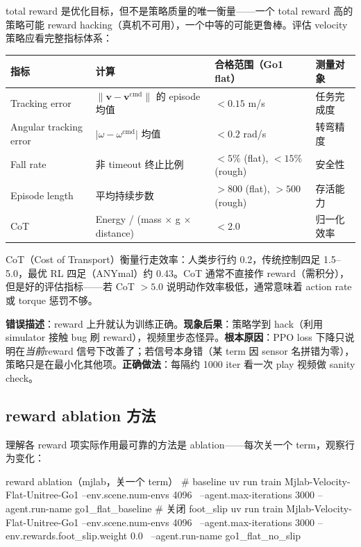 total reward 是优化目标，但不是策略质量的唯一衡量——一个 total reward 高的策略可能 reward hacking（真机不可用），一个中等的可能更鲁棒。评估 velocity 策略应看完整指标体系：

\begin{center}
\small
\begin{tabular}{@{}llll@{}}
\toprule
指标 & 计算 & 合格范围（Go1 flat） & 测量对象 \\
\midrule
Tracking error & $\lVert \mathbf{v}-\mathbf{v}^{\text{cmd}}\rVert$ 的 episode 均值 & $<0.15$ m/s & 任务完成度 \\
Angular tracking error & $\lvert \omega-\omega^{\text{cmd}}\rvert$ 均值 & $<0.2$ rad/s & 转弯精度 \\
Fall rate & 非 timeout 终止比例 & $<5\%$ (flat), $<15\%$ (rough) & 安全性 \\
Episode length & 平均持续步数 & $>800$ (flat), $>500$ (rough) & 存活能力 \\
CoT & Energy / (mass $\times$ g $\times$ distance) & $<2.0$ & 归一化效率 \\
\bottomrule
\end{tabular}
\end{center}

CoT（Cost of Transport）衡量行走效率：人类步行约 0.2，传统控制四足 1.5--5.0，最优 RL 四足（ANYmal）约 0.43。CoT 通常不直接作 reward（需积分），但是好的评估指标——若 CoT $>5.0$ 说明动作效率极低，通常意味着 action rate 或 torque 惩罚不够。

\begin{pitfall}
\textbf{错误描述}：reward 上升就认为训练正确。\textbf{现象后果}：策略学到 hack（利用 simulator 接触 bug 刷 reward），视频里步态怪异。\textbf{根本原因}：PPO loss 下降只说明在\emph{当前}reward 信号下改善了；若信号本身错（某 term 因 sensor 名拼错为零），策略只是在最小化其他项。\textbf{正确做法}：每隔约 1000 iter 看一次 play 视频做 sanity check。
\end{pitfall}

\subsection{reward ablation 方法}
\label{sec:rlmc-ql-train-ablation}

理解各 reward 项实际作用最可靠的方法是 ablation——每次关一个 term，观察行为变化：

\begin{codebox}[bash]{reward ablation（mjlab，关一个 term）}
# baseline
uv run train Mjlab-Velocity-Flat-Unitree-Go1 --env.scene.num-envs 4096 \
  --agent.max-iterations 3000 --agent.run-name go1_flat_baseline
# 关闭 foot_slip
uv run train Mjlab-Velocity-Flat-Unitree-Go1 --env.scene.num-envs 4096 \
  --agent.max-iterations 3000 --env.rewards.foot_slip.weight 0.0 \
  --agent.run-name go1_flat_no_slip
\end{codebox}


